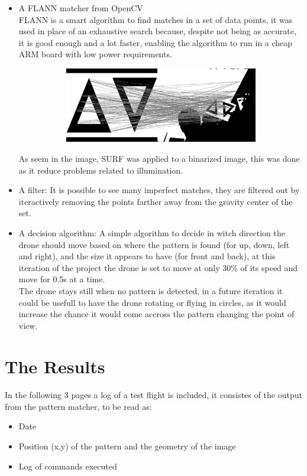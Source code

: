 \documentclass[11pt,twoside,a4paper]{article}
\begin{document}
\begin{itemize}
  \item A FLANN matcher from OpenCV\\
FLANN is a smart algorithm to find matches in a set of data points, it was used
in place of an exhaustive search because, despite not being as accurate, it is
good enough and a lot faster, enabling the algorithm to run in a cheap ARM board
with low power requirements.
\begin{figure}[hbtp]
  \centering
\begin{subfigure}{.99\textwidth}
  \centering
  \includegraphics[width=.8\linewidth]{matches.jpg}
\end{subfigure}
\end{figure}
As seem in the image, SURF was applied to a binarized image, this was done as it
reduce problems related to illumination.

  \item A filter: It is possible to see many imperfect matches, they are
filtered out by iteractively removing the points farther away from the gravity
center of the set.

  \item A decision algorithm: A simple algorithm to decide in witch direction
the drone should move based on where the pattern is found (for up, down, left
and right), and the size it appears to have (for front and back), at this
iteration of the project the drone is set to move at only 30\% of its speed
and move for 0.5s at a time.\\
The drone stays still when no pattern is detected, in a future iteration it
could be usefull to have the drone rotating or flying in circles, as it would
increase the chance it would come accross the pattern changing the point of
view.
\end{itemize}


\section{The Results}
\paragraph {} In the following 3 pages a log of a test flight is included, it
consistes of the output from the pattern matcher, to be read as:
\begin{itemize}
\item Date
\item Position (x,y) of the pattern and the geometry of the image
\item Log of commands executed
\end{itemize}
\end{document}
